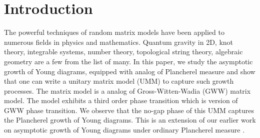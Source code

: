 \documentclass[3p,12pt]{elsarticle}
\numberwithin{equation}{section}
\begin{document}
\section{Introduction}
\label{sec:intro}

The powerful techniques of random matrix models have been applied to numerous fields in physics and mathematics. Quantum gravity in 2D, knot theory, integrable systems, number theory, topological string theory, algebraic geometry are a few from the list of many. In this paper, we study the asymptotic growth of Young diagrams, equipped with \qq analog of Plancherel measure and show that one can write a unitary matrix model (UMM) to capture such growth processes. The matrix model is a \qq analog of Gross-Witten-Wadia (GWW) matrix model. The model exhibits a third order phase transition which is \qd version of GWW phase transition. We observe that the no-gap phase of this UMM captures the \qd Plancherel growth of Young diagrams. This is an extension of our earlier work on asymptotic growth of Young diagrams under ordinary Plancherel measure \cite{Chattopadhyay:2019pkl}.
\end{document}
